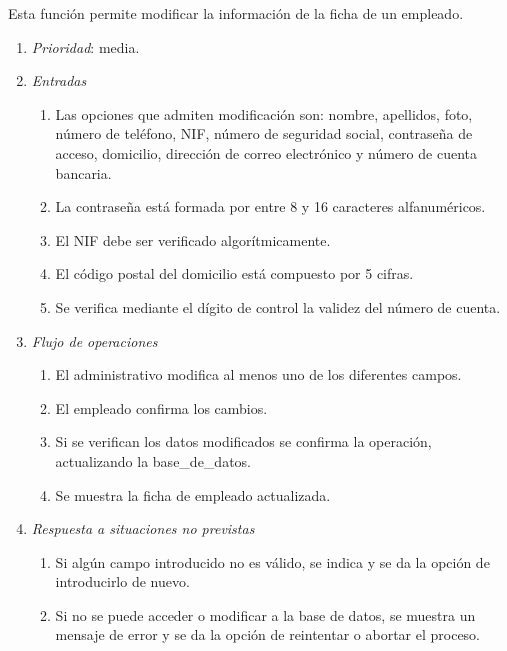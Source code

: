

	Esta función permite modificar la información de la ficha de un empleado.

	\begin{enumerate}
		\item \textit{Prioridad}: media.
		\item \textit{Entradas}
		\begin{enumerate}
			\item Las opciones que admiten modificación son: nombre, apellidos, foto, número de teléfono, NIF, número de seguridad social, contraseña de acceso, domicilio, dirección de correo electrónico y número de cuenta bancaria.
			\item La contraseña está formada por entre 8 y 16 caracteres alfanuméricos.
			\item El \gls{NIF} debe ser verificado algorítmicamente.
			\item El código postal del domicilio está compuesto por 5 cifras.
			\item Se verifica mediante el dígito de control la validez del número de cuenta.
		\end{enumerate}
		\item \textit{Flujo de operaciones}
		\begin{enumerate}
			\item El administrativo modifica al menos uno de los diferentes campos.
			\item El empleado confirma los cambios.
			\item Si se verifican los datos modificados se confirma la operación, actualizando la \gls{base_de_datos}.
			\item Se muestra la ficha de empleado actualizada.
		\end{enumerate}
		\item \textit{Respuesta a situaciones no previstas}
		\begin{enumerate}
			\item Si algún campo introducido no es válido, se indica y se da la opción de introducirlo de nuevo.
			\item Si no se puede acceder o modificar a la base de datos, se muestra un mensaje de error y se da la opción de reintentar o abortar el proceso.
		\end{enumerate}
	\end{enumerate}
